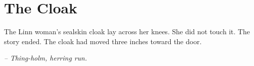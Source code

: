 \chapter*{The Cloak}

The Linn woman's sealskin cloak lay across her knees. She did not touch it. The story ended. The cloak had moved three inches toward the door.

\smallskip

\noindent \textit{-- Thing-holm, herring run.}

